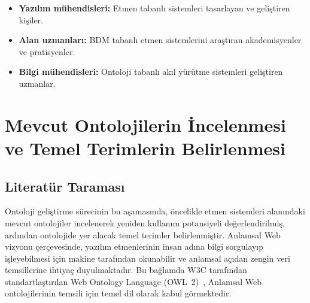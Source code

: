 \documentclass[10pt, a4paper, twocolumn]{article}
\begin{document}
\begin{itemize}
    \item \textbf{Yazılım mühendisleri:} Etmen tabanlı sistemleri tasarlayan ve geliştiren kişiler.
    \item \textbf{Alan uzmanları:} BDM tabanlı etmen sistemlerini araştıran akademisyenler ve pratisyenler.
    \item \textbf{Bilgi mühendisleri:} Ontoloji tabanlı akıl yürütme sistemleri geliştiren uzmanlar.
\end{itemize}


\section{Mevcut Ontolojilerin İncelenmesi ve Temel Terimlerin Belirlenmesi}

\subsection{Literatür Taraması}
Ontoloji geliştirme sürecinin bu aşamasında, öncelikle etmen sistemleri alanındaki mevcut ontolojiler incelenerek yeniden kullanım potansiyeli değerlendirilmiş, ardından ontolojide yer alacak temel terimler belirlenmiştir. Anlamsal Web vizyonu çerçevesinde, yazılım etmenlerinin insan adına bilgi sorgulayıp işleyebilmesi için makine tarafından okunabilir ve anlamsal açıdan zengin veri temsillerine ihtiyaç duyulmaktadır. Bu bağlamda W3C tarafından standartlaştırılan Web Ontology Language (OWL~2)~\cite{w3c2012owl2}, Anlamsal Web ontolojilerinin temsili için temel dil olarak kabul görmektedir.
\end{document}
